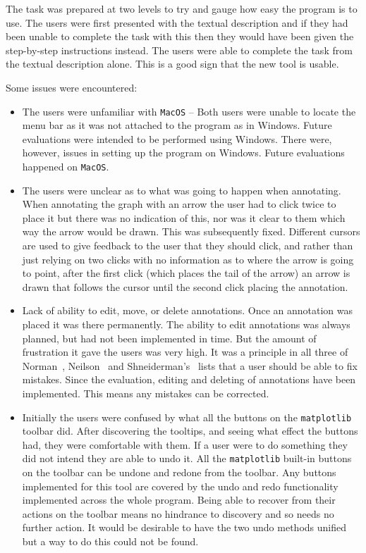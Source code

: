 The task was prepared at two levels to try and gauge how easy the program is to use.  The users were first presented with the textual description and if they had been unable to complete the task with this then they would have been given the step-by-step instructions instead.  The users were able to complete the task from the textual description alone.  This is a good sign that the new tool is usable.

Some issues were encountered:

\begin{itemize}
\item The users were unfamiliar with \texttt{MacOS} -- Both users were unable to locate the menu bar as it was not attached to the program as in Windows.  Future evaluations were intended to be performed using Windows.  There were, however, issues in setting up the program on Windows.  Future evaluations happened on \texttt{MacOS}.
\item The users were unclear as to what was going to happen when annotating.  When annotating the graph with an arrow the user had to click twice to place it but there was no indication of this, nor was it clear to them which way the arrow would be drawn.  This was subsequently fixed. Different cursors are used to give feedback to the user that they should click, and rather than just relying on two clicks with no information as to where the arrow is going to point, after the first click (which places the tail of the arrow) an arrow is drawn that follows the cursor until the second click placing the annotation.
\item Lack of ability to edit, move, or delete annotations. Once an annotation was placed it was there permanently.  The ability to edit annotations was always planned, but had not been implemented in time.  But the amount of frustration it gave the users was very high.  It was a principle in all three of Norman~\cite{normsev}, Neilson~\cite{neilten} and Shneiderman's~\cite{shgold} lists that a user should be able to fix mistakes.  Since the evaluation, editing and deleting of annotations have been implemented.  This means any mistakes can be corrected.
\item Initially the users were confused by what all the buttons on the \texttt{matplotlib} toolbar did.  After discovering the tooltips, and seeing what effect the buttons had, they were comfortable with them.  If a user were to do something they did not intend they are able to undo it. All the \texttt{matplotlib} built-in buttons on the toolbar can be undone and redone from the toolbar.  Any buttons implemented for this tool are covered by the undo and redo functionality implemented across the whole program.  Being able to recover from their actions on the toolbar means no hindrance to discovery and so needs no further action.  It would be desirable to have the two undo methods unified but a way to do this could not be found.

\end{itemize}
